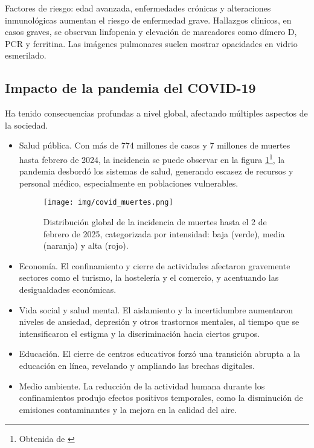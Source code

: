 \begin{enumerate}
Factores de riesgo: edad avanzada, enfermedades crónicas y alteraciones inmunológicas aumentan el riesgo de enfermedad grave. Hallazgos clínicos, en casos graves, se observan linfopenia y elevación de marcadores como dímero D, PCR y ferritina. Las imágenes pulmonares suelen mostrar opacidades en vidrio esmerilado.

\subsection{Impacto de la pandemia del COVID-19}
Ha tenido consecuencias profundas a nivel global, afectando múltiples aspectos de la sociedad. 
\begin{itemize}
\item Salud pública. Con más de 774 millones de casos y 7 millones de muertes hasta febrero de 2024, la incidencia se puede observar en la figura \ref{fig:muertes covid}\footnote{Obtenida de \cite{elpais_covidmap}}, la pandemia desbordó los sistemas de salud, generando escasez de recursos y personal médico, especialmente en poblaciones vulnerables.
\begin{figure}[H]
        \centering
        \texttt{[image: img/covid\_muertes.png]}
        \caption{Distribución global de la incidencia de muertes hasta el 2 de febrero de 2025, categorizada por intensidad: baja (verde), media (naranja) y alta (rojo).}
        \label{fig:muertes covid}
        \vspace{0.5cm} %
\end{figure}

    \item Economía. El confinamiento y cierre de actividades afectaron gravemente sectores como el turismo, la hostelería y el comercio, y acentuando las desigualdades económicas.
    \item Vida social y salud mental. El aislamiento y la incertidumbre aumentaron niveles de ansiedad, depresión y otros trastornos mentales, al tiempo que se intensificaron el estigma y la discriminación hacia ciertos grupos.
    \item Educación. El cierre de centros educativos forzó una transición abrupta a la educación en línea, revelando y ampliando las brechas digitales.
    \item Medio ambiente. La reducción de la actividad humana durante los confinamientos produjo efectos positivos temporales, como la disminución de emisiones contaminantes y la mejora en la calidad del aire.
\end{itemize}


\end{enumerate}
